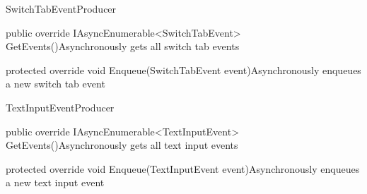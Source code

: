 \begin{class}{SwitchTabEventProducer} 
    


    \begin{methods}
        \begin{method}{public override IAsyncEnumerable<SwitchTabEvent> GetEvents()}{Asynchronously gets all switch tab events}
        \end{method}
        \begin{method}{protected override void Enqueue(SwitchTabEvent event)}{Asynchronously enqueues a new switch tab event}
            \begin{parameters}
            \end{parameters}
        \end{method}
    \end{methods}
\end{class}

\begin{class}{TextInputEventProducer} 
    


    \begin{methods}
        \begin{method}{public override IAsyncEnumerable<TextInputEvent> GetEvents()}{Asynchronously gets all text input events}
        \end{method}
        \begin{method}{protected override void Enqueue(TextInputEvent event)}{Asynchronously enqueues a new text input event}
            \begin{parameters}
            \end{parameters}
        \end{method}
    \end{methods}
\end{class}

